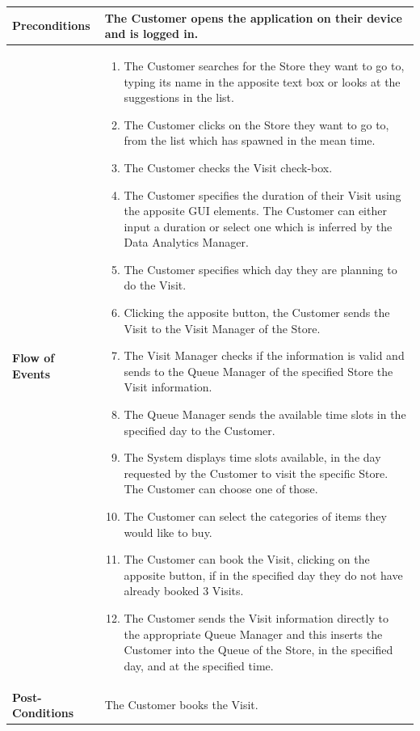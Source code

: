 \documentclass[a4paper, 12pt, oneside]{article}
\begin{document}
\begin{enumerate}[labelindent=20pt, label={UC.\arabic*}, itemindent=1em,leftmargin=!]
\begin{tabularx}{\linewidth}{| l | X |}
    \hline
    \textbf{Preconditions} & The Customer opens the application on their device and is logged in.\\
    
    \hline
    \textbf{Flow of Events} & \parbox{0.7\textwidth}{   
        \begin{enumerate}
            \item The Customer searches for the Store they want to go to, typing its name in the apposite text box or looks at the suggestions in the list.
            \item The Customer clicks on the Store they want to go to, from the list which has spawned in the mean time.
            \item The Customer checks the Visit check-box.
            \item The Customer specifies the duration of their Visit using the apposite GUI elements. The Customer can either input a duration or select one which is inferred by the Data Analytics Manager.
            \item The Customer specifies which day they are planning to do the Visit.
            \item Clicking the apposite button, the Customer sends the Visit to the Visit Manager of the Store.
            \item The Visit Manager checks if the information is valid and sends to the Queue Manager of the specified Store the Visit information.
            \item The Queue Manager sends the available time slots in the specified day to the Customer.
            \item The System displays time slots available, in the day requested by the Customer to visit the specific Store. The Customer can choose one of those.
            \item The Customer can select the categories of items they would like to buy.
            \item The Customer can book the Visit, clicking on the apposite button, if in the specified day they do not have already booked 3 Visits.
            \item The Customer sends the Visit information directly to the appropriate Queue Manager and this inserts the Customer into the Queue of the Store, in the specified day, and at the specified time.
    \end{enumerate}}\\
    
    \hline
    \textbf{Post-Conditions} & The Customer books the Visit.\\
    

\end{tabularx}
\end{enumerate}
\end{document}
